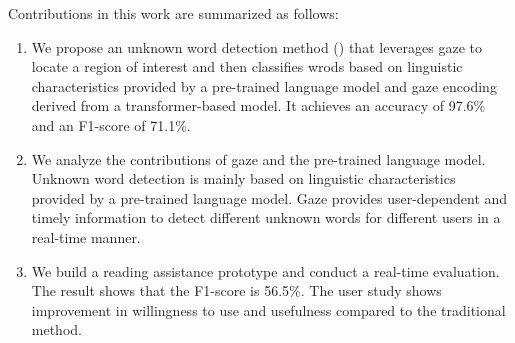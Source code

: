 Contributions in this work are summarized as follows:
\begin{enumerate}
    \item We propose an unknown word detection method (\name{}) that leverages gaze to locate a region of interest and then classifies wrods based on linguistic characteristics provided by a pre-trained language model and gaze encoding derived from a transformer-based model. It achieves an accuracy of 97.6\% and an F1-score of 71.1\%.
    \item We analyze the contributions of gaze and the pre-trained language model. Unknown word detection is mainly based on linguistic characteristics provided by a pre-trained language model. Gaze provides user-dependent and timely information to detect different unknown words for different users in a real-time manner.
    \item We build a reading assistance prototype and conduct a real-time evaluation. The result shows that the F1-score is 56.5\%. The user study shows improvement in willingness to use and usefulness compared to the traditional method.
\end{enumerate}

